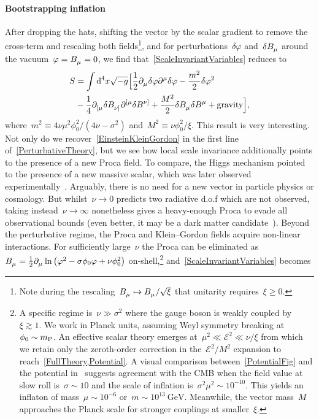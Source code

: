 \documentclass[aps,prd,reprint,preprintnumbers,showpacs,floatfix,nofootinbib,superscript address]{revtex4-2}
\begin{document}
\paragraph*{Bootstrapping inflation} After dropping the hats, shifting the vector by the scalar gradient to remove the cross-term and rescaling both fields\footnote{Note during the rescaling~$\FieldV{_\mu}\mapsto\FieldV{_\mu}/\sqrt{\xi}$ that unitarity requires~$\xi\geq 0$.}, and for perturbations~$\delta\varphi$ and~$\delta\FieldV{_\mu}$ around the vacuum~$\varphi=\FieldV{_\mu}= 0$, we find that~\cref{ScaleInvariantVariables} reduces to
\begin{align}\label{PerturbativeTheory}
S&=\int\mathrm{d}^4x\sqrt{-g}\Big[\frac{1}{2}\PD{_\mu}\delta\varphi\PD{^\mu}\delta\varphi-\frac{m^2}{2}\delta\varphi^2\nonumber\\
	&-\frac{1}{4}\PD{_{[\mu}}\delta\FieldV{_{\nu]}}\PD{^{[\mu}}\delta\FieldV{^{\nu]}}+\frac{M^2}{2} \delta\FieldV{_\mu}\delta\FieldV{^\mu}+\text{gravity}\Big],
\end{align}
where~$m^2\equiv4\nu\mu^2\phi_0^2/(4\nu-\sigma^2)$ and~$M^2\equiv\nu\phi_0^2/\xi$. This result is very interesting. Not only do we recover~\cref{EinsteinKleinGordon} in the first line of~\cref{PerturbativeTheory}, but we see how local scale invariance additionally points to the presence of a new Proca field. To compare, the Higgs mechanism pointed to the presence of a new massive scalar, which was later observed experimentally~\cite{CMS:2012qbp}. Arguably, there is no need for a new vector in particle physics or cosmology. But whilst~$\nu\to 0$ predicts two radiative d.o.f which are not observed, taking instead~$\nu\to \infty$ nonetheless gives a heavy-enough Proca to evade all observational bounds (even better, it may be a dark matter candidate~\cite{Lasenby:2015dba}). Beyond the perturbative regime, the Proca and Klein--Gordon fields acquire non-linear interactions. For sufficiently large~$\nu$ the Proca can be eliminated as~$\FieldV{_\mu}=\frac{1}{2}\PD{_\mu}\ln\left(\varphi^2-\sigma\phi_0\varphi+\nu\phi_0^2\right)$ on-shell,\footnote{A specific regime is~$\nu\gg\sigma^2$ where the gauge boson is weakly coupled by~$\xi\gtrsim 1$. We work in Planck units, assuming Weyl symmetry breaking at~$\phi_0\sim{m_{\mathrm{P}}}{}$. An effective scalar theory emerges at~$\mu^2\ll\mathcal{E}^2\ll\nu/\xi$ from which we retain only the zeroth-order correction in the~$\mathcal{E}^2/M^2$ expansion to reach~\cref{FullTheory,Potential}. A visual comparison between~\cref{PotentialFig} and the potential in~\cite{Salvio:2022suk} suggests agreement with the CMB when the field value at slow roll is~$\sigma\sim 10$ and the scale of inflation is~$\sigma^2\mu^2\sim 10^{-10}$. This yields an inflaton of mass~$\mu\sim 10^{-6}$ or~$m\sim 10^{13}\SI{}{\giga\electronvolt}$. Meanwhile, the vector mass~$M$ approaches the Planck scale for stronger couplings at smaller~$\xi$.} and~\cref{ScaleInvariantVariables} becomes
\end{document}

